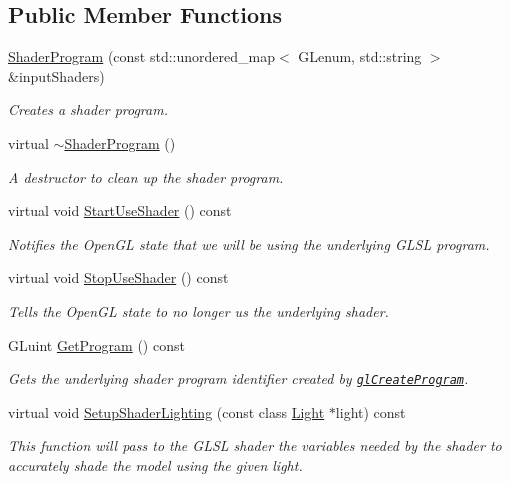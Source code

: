 \subsection*{Public Member Functions}
\begin{DoxyCompactItemize}
\item 
\hyperlink{class_shader_program_aba2db5734b2f70cc34078126ad279588}{Shader\+Program} (const std\+::unordered\+\_\+map$<$ G\+Lenum, std\+::string $>$ \&input\+Shaders)
\begin{DoxyCompactList}\small\item\em Creates a shader program. \end{DoxyCompactList}\item 
virtual \hyperlink{class_shader_program_a2d2eadcfc48cc2e2ddb82aba70553a9f}{$\sim$\+Shader\+Program} ()
\begin{DoxyCompactList}\small\item\em A destructor to clean up the shader program. \end{DoxyCompactList}\item 
virtual void \hyperlink{class_shader_program_a906b0232f27663b28cc800ac2851541f}{Start\+Use\+Shader} () const 
\begin{DoxyCompactList}\small\item\em Notifies the Open\+G\+L state that we will be using the underlying G\+L\+S\+L program. \end{DoxyCompactList}\item 
virtual void \hyperlink{class_shader_program_a5afb6f91d30b6e197fab0827c416c51f}{Stop\+Use\+Shader} () const 
\begin{DoxyCompactList}\small\item\em Tells the Open\+G\+L state to no longer us the underlying shader. \end{DoxyCompactList}\item 
G\+Luint \hyperlink{class_shader_program_a281396edbb786eacf86ae4997a3e90c6}{Get\+Program} () const 
\begin{DoxyCompactList}\small\item\em Gets the underlying shader program identifier created by \href{https://www.opengl.org/sdk/docs/man/html/glCreateProgram.xhtml}{\tt gl\+Create\+Program}. \end{DoxyCompactList}\item 
virtual void \hyperlink{class_shader_program_a2f3c1c149aa0988e07e0a513c69c1770}{Setup\+Shader\+Lighting} (const class \hyperlink{class_light}{Light} $\ast$light) const 
\begin{DoxyCompactList}\small\item\em This function will pass to the G\+L\+S\+L shader the variables needed by the shader to accurately shade the model using the given light. \end{DoxyCompactList}\item 

\end{DoxyCompactItemize}
